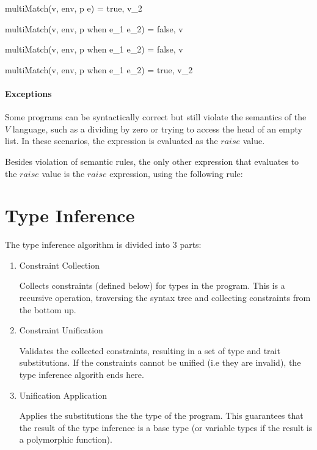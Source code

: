 \documentclass{article}
\begin{document}
  {multiMatch(v, \mbox{env}, p \rightarrow e) = true, v_2}

  {multiMatch(v, \mbox{env}, p \; \mbox{when} \; e_1 \rightarrow e_2) = false, v}

  {multiMatch(v, \mbox{env}, p \; \mbox{when} \; e_1 \rightarrow e_2) = false, v}

  {multiMatch(v, \mbox{env}, p \; \mbox{when} \; e_1 \rightarrow e_2) = true, v_2}

\paragraph{Exceptions}

Some programs can be syntactically correct but still violate the semantics of the $V$ language, such as a dividing by zero or trying to access the head of an empty list.
In these scenarios, the expression is evaluated as the $raise$ value.

Besides violation of semantic rules, the only other expression that evaluates to the $raise$ value is the $raise$ expression, using the following rule:


\section{Type Inference}

The type inference algorithm is divided into 3 parts:

\begin{enumerate}
  \item Constraint Collection

    Collects constraints (defined below) for types in the program.
    This is a recursive operation, traversing the syntax tree and collecting constraints from the bottom up.

  \item Constraint Unification

    Validates the collected constraints, resulting in a set of type and trait substitutions.
    If the constraints cannot be unified (i.e they are invalid), the type inference algorith ends here.

  \item Unification Application

    Applies the substitutions the the type of the program.
    This guarantees that the result of the type inference is a base type (or variable types if the result is a polymorphic function).
\end{enumerate}
\end{document}
